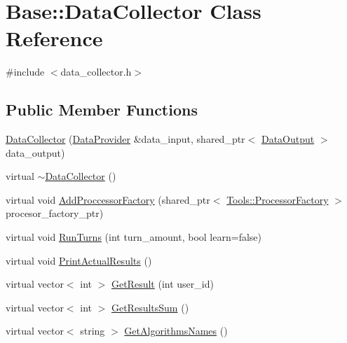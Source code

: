 \hypertarget{classBase_1_1DataCollector}{\section{Base\-:\-:Data\-Collector Class Reference}
\label{classBase_1_1DataCollector}
}


{\ttfamily \#include $<$data\-\_\-collector.\-h$>$}

\subsection*{Public Member Functions}
\begin{DoxyCompactItemize}
\item 
\hyperlink{classBase_1_1DataCollector_a3f64da07dd97a418061c7f6e24dd422c}{Data\-Collector} (\hyperlink{classBase_1_1DataProvider}{Data\-Provider} \&data\-\_\-input, shared\-\_\-ptr$<$ \hyperlink{classBase_1_1DataOutput}{Data\-Output} $>$ data\-\_\-output)
\item 
virtual \hyperlink{classBase_1_1DataCollector_aa7deb91a435cbd42091e560e152609ab}{$\sim$\-Data\-Collector} ()
\item 
virtual void \hyperlink{classBase_1_1DataCollector_aa882730336c5d171acfaab053698fe7f}{Add\-Proccessor\-Factory} (shared\-\_\-ptr$<$ \hyperlink{classTools_1_1ProcessorFactory}{Tools\-::\-Processor\-Factory} $>$ procesor\-\_\-factory\-\_\-ptr)
\item 
virtual void \hyperlink{classBase_1_1DataCollector_a5f82cf1aa48981c36cb2e0eba944c148}{Run\-Turns} (int turn\-\_\-amount, bool learn=false)
\item 
virtual void \hyperlink{classBase_1_1DataCollector_afb1d46273c24e3e1fdefba6b730ebf28}{Print\-Actual\-Results} ()
\item 
virtual vector$<$ int $>$ \hyperlink{classBase_1_1DataCollector_afaacb5f36d09faf5e6633a03aa26fdae}{Get\-Result} (int user\-\_\-id)
\item 
virtual vector$<$ int $>$ \hyperlink{classBase_1_1DataCollector_ab300045605fb48a975be8c93f7e93b6f}{Get\-Results\-Sum} ()
\item 
virtual vector$<$ string $>$ \hyperlink{classBase_1_1DataCollector_a52bf3c7c4a610191acd56fa8628ac758}{Get\-Algorithms\-Names} ()
\end{DoxyCompactItemize}


